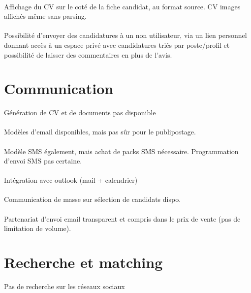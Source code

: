 \documentclass[12pt,twoside]{scrreprt}
\begin{document}
\paragraph{} Affichage du CV sur le coté de la fiche candidat, au format source. CV images affichés même sans parsing.
\paragraph{} Possibilité d'envoyer des candidatures à un non utilisateur, via un lien personnel donnant accès à un espace privé avec candidatures triés par poste/profil et possibilité de laisser des commentaires en plus de l'avis.


\section{Communication}
\paragraph{} Génération de CV et de documents pas disponible
\paragraph{} Modèles d'email disponibles, mais pas sûr pour le publipostage.
\paragraph{} Modèle SMS également, mais achat de packs SMS nécessaire. Programmation d'envoi SMS pas certaine.
\paragraph{} Intégration avec outlook (mail + calendrier)
\paragraph{} Communication de masse sur sélection de candidats dispo.
\paragraph{} Partenariat d'envoi email transparent et compris dans le prix de vente (pas de limitation de volume).


\section{Recherche et matching}
\paragraph{} Pas de recherche sur les réseaux sociaux
\end{document}
